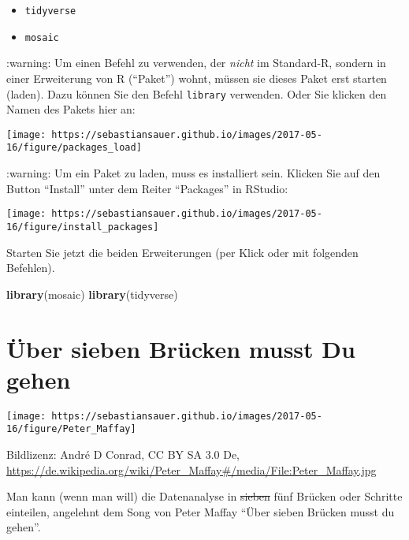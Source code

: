 \documentclass[]{article}
\newenvironment{Shaded}{\begin{snugshade}}{\end{snugshade}}
\newcommand{\KeywordTok}[1]{\textcolor[rgb]{0.13,0.29,0.53}{\textbf{#1}}}
\newcommand{\NormalTok}[1]{#1}
\providecommand{\tightlist}{%
  \setlength{\itemsep}{0pt}\setlength{\parskip}{0pt}}
\begin{document}
\begin{itemize}
\tightlist
\item
  \texttt{tidyverse}
\item
  \texttt{mosaic}
\end{itemize}

:warning: Um einen Befehl zu verwenden, der \emph{nicht} im Standard-R,
sondern in einer Erweiterung von R (``Paket'') wohnt, müssen sie dieses
Paket erst starten (laden). Dazu können Sie den Befehl \texttt{library}
verwenden. Oder Sie klicken den Namen des Pakets hier an:

\begin{center}\texttt{[image: https://sebastiansauer.github.io/images/2017-05-16/figure/packages\_load]} \end{center}

:warning: Um ein Paket zu laden, muss es installiert sein. Klicken Sie
auf den Button ``Install'' unter dem Reiter ``Packages'' in RStudio:

\begin{center}\texttt{[image: https://sebastiansauer.github.io/images/2017-05-16/figure/install\_packages]} \end{center}

Starten Sie jetzt die beiden Erweiterungen (per Klick oder mit folgenden
Befehlen).

\begin{Shaded}
\begin{Highlighting}[]
\KeywordTok{library}\NormalTok{(mosaic)}
\KeywordTok{library}\NormalTok{(tidyverse)}
\end{Highlighting}
\end{Shaded}

\hypertarget{uber-sieben-brucken-musst-du-gehen}{%
\section{Über sieben Brücken musst Du
gehen}\label{uber-sieben-brucken-musst-du-gehen}}

\begin{center}\texttt{[image: https://sebastiansauer.github.io/images/2017-05-16/figure/Peter\_Maffay]} \end{center}

Bildlizenz: André D Conrad, CC BY SA 3.0 De,
\url{https://de.wikipedia.org/wiki/Peter_Maffay\#/media/File:Peter_Maffay.jpg}

Man kann (wenn man will) die Datenanalyse in \sout{sieben} fünf Brücken
oder Schritte einteilen, angelehnt dem Song von Peter Maffay ``Über
sieben Brücken musst du gehen''.
\end{document}
